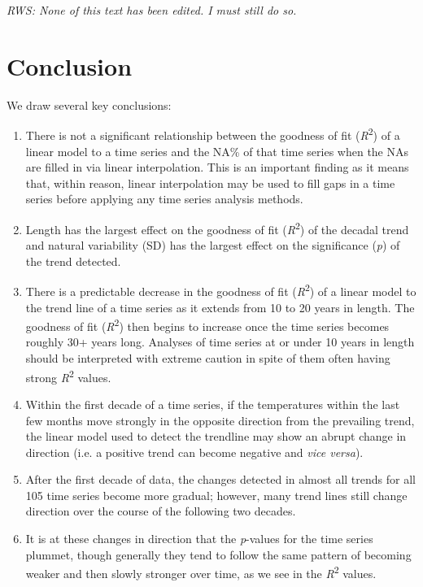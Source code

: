 \documentclass{ametsoc}
\begin{document}
\emph{RWS: None of this text has been edited. I must still do so.}
\section{Conclusion}
We draw several key conclusions:

\begin{enumerate}
\item There is not a significant relationship between the goodness of fit (\emph{R}\textsuperscript{2}) of a linear model to a time series and the NA\% of that time series when the NAs are filled in via linear interpolation. This is an important finding as it means that, within reason, linear interpolation may be used to fill gaps in a time series before applying any time series analysis methods.

\item Length has the largest effect on the goodness of fit (\emph{R}\textsuperscript{2}) of the decadal trend and natural variability (SD) has the largest effect on the significance (\emph{p}) of the trend detected.

\item There is a predictable decrease in the goodness of fit (\emph{R}\textsuperscript{2}) of a linear model to the trend line of a time series as it extends from 10 to 20 years in length. The goodness of fit (\emph{R}\textsuperscript{2}) then begins to increase once the time series becomes roughly 30+ years long. Analyses of time series at or under 10 years in length should be interpreted with extreme caution in spite of them often having strong \emph{R}\textsuperscript{2} values.

\item Within the first decade of a time series, if the temperatures within the last few months move strongly in the opposite direction from the prevailing trend, the linear model used to detect the trendline may show an abrupt change in direction (i.e. a positive trend can become negative and \emph{vice versa}).

\item After the first decade of data, the changes detected in almost all trends for all 105 time series become more gradual; however, many trend lines still change direction over the course of the following two decades.

\item It is at these changes in direction that the \emph{p}-values for the time series plummet, though generally they tend to follow the same pattern of becoming weaker and then slowly stronger over time, as we see in the \emph{R}\textsuperscript{2} values.


\end{enumerate}
\end{document}
